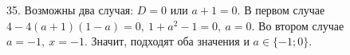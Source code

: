 35. Возможны два случая: $D=0$ или $a+1=0.$ В первом случае $4-4(a+1)(1-a)=0,\ 1+a^2-1=0,\ a=0.$ Во втором случае $a=-1,\ x=-1.$ Значит, подходят оба значения и $a\in\{-1;0\}.$\\
